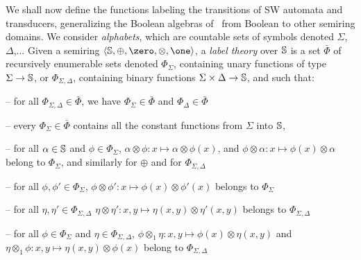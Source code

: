 %
%
We shall now define the functions labeling the transitions of SW automata and transducers,
generalizing the Boolean algebras of~\cite{dAntoniVeanes17CAV}
from Boolean to other semiring domains.
%
We consider \emph{alphabets}, which are countable sets of symbols
denoted $\Sigma$, $\Delta$,...
%
\noindent
Given a semiring $\< \Semiring, \oplus, \zero, \otimes, \one>$,
a \emph{label theory} over $\mathbb{S}$
is a set $\bar\Phi$ of recursively enumerable sets denoted
$\Phi_\Sigma$, %
containing unary functions of type $\Sigma \to \mathbb{S}$, %
or $\Phi_{\Sigma, \Delta}$, containing binary functions $\Sigma \times \Delta \to \mathbb{S}$,
and such that:

\noindent --
for all $\Phi_{\Sigma, \Delta} \in \bar\Phi$, we have
$\Phi_{\Sigma} \in \bar\Phi$ and $\Phi_{\Delta} \in \bar\Phi$

\noindent --
every $\Phi_{\Sigma}\in \bar\Phi$ contains all the constant functions from $\Sigma$ into $\mathbb{S}$,

\noindent --
for all $\alpha \in \mathbb{S}$ and $\phi \in \Phi_\Sigma$,
      $\alpha \otimes \phi : x \mapsto \alpha \otimes \phi(x)$,
      and $\phi \otimes \alpha : x \mapsto \phi(x) \otimes \alpha$\\
\phantom{--} belong to $\Phi_\Sigma$, and similarly for $\oplus$
      and for $\Phi_{\Sigma, \Delta}$

\noindent --
for all $\phi, \phi' \in \Phi_\Sigma$,
$\phi \otimes \phi': x \mapsto \phi(x) \otimes \phi'(x)$ belongs to $\Phi_\Sigma$

\noindent --
for all $\eta, \eta' \in \Phi_{\Sigma, \Delta}$
$\eta \otimes \eta': x, y \mapsto \eta(x, y) \otimes \eta'(x, y)$ belongs to $\Phi_{\Sigma, \Delta}$

\noindent --
for all $\phi \in \Phi_\Sigma$ and $\eta \in \Phi_{\Sigma, \Delta}$,
$\phi \otimes_1 \eta: x, y \mapsto \phi(x) \otimes \eta(x, y)$ and\\
\phantom{--} $\eta \otimes_1 \phi: x, y \mapsto \eta(x, y) \otimes \phi(x)$
belong to $\Phi_{\Sigma, \Delta}$

